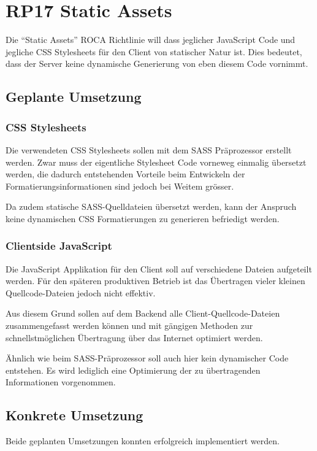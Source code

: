 \section{RP17 Static Assets}
\label{sec:principle-rp17-static-assets}

Die ``Static Assets'' ROCA Richtlinie will dass jeglicher JavaScript Code und jegliche CSS Stylesheets für den Client von statischer Natur ist. Dies bedeutet, dass der Server keine dynamische Generierung von eben diesem Code vornimmt.

\subsection*{Geplante Umsetzung}
\subsubsection*{CSS Stylesheets}
Die verwendeten CSS Stylesheets sollen mit dem SASS Präprozessor \cite{SASS} erstellt werden. Zwar muss der eigentliche Stylesheet Code vorneweg einmalig übersetzt werden, die dadurch entstehenden Vorteile beim Entwickeln der Formatierungsinformationen sind jedoch bei Weitem grösser.

Da zudem statische SASS-Quelldateien übersetzt werden, kann der Anspruch keine dynamischen CSS Formatierungen zu generieren befriedigt werden.

\subsubsection*{Clientside JavaScript}
Die JavaScript Applikation für den Client soll auf verschiedene Dateien aufgeteilt werden. Für den späteren produktiven Betrieb ist das Übertragen vieler kleinen Quellcode-Dateien jedoch nicht effektiv.

Aus diesem Grund sollen auf dem Backend alle Client-Quellcode-Dateien zusammengefasst werden können und mit gängigen Methoden zur schnellstmöglichen Übertragung über das Internet optimiert werden.

Ähnlich wie beim SASS-Präprozessor soll auch hier kein dynamischer Code entstehen. Es wird lediglich eine Optimierung der zu übertragenden Informationen vorgenommen.


\subsection*{Konkrete Umsetzung}
Beide geplanten Umsetzungen konnten erfolgreich implementiert werden.

